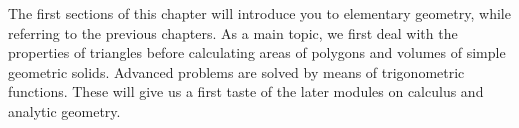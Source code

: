 

\Mtikzexternalize

\MSetSubject{\MINTMathematics}




\begin{MSectionStart}

\MModstartBox

The first sections of this chapter will introduce you to elementary geometry, while referring 
to the previous chapters. As a main topic, we first deal with the properties of triangles before 
calculating areas of polygons and volumes of simple geometric solids. Advanced problems are solved 
by means of trigonometric functions. These will give us a first taste of the later modules 
on calculus and analytic geometry.

 
\end{MSectionStart}



